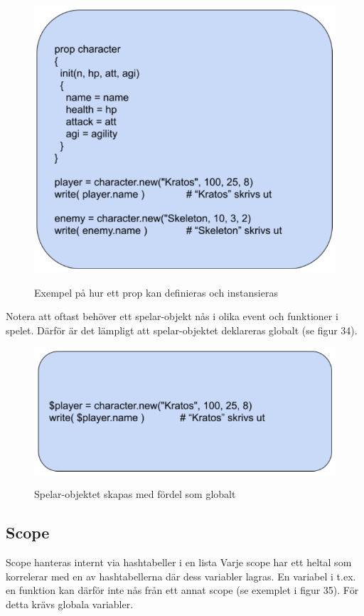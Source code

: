 \documentclass{Dokumentmall}
\begin{document}
\begin{figure}[h!]
  \centering
  \includegraphics[scale = 0.65]{Images/Figur33.png}
  \label{}
  \caption{Exempel på hur ett prop kan definieras och instansieras}
\end{figure}

Notera att oftast behöver ett spelar-objekt nås i olika event och funktioner i spelet. Därför är det lämpligt att spelar-objektet deklareras globalt (se figur 34).

\begin{figure}[h!]
  \centering
  \includegraphics[scale = 0.65]{Images/Figur34.png}
  \label{}
  \caption{Spelar-objektet skapas med fördel som globalt}
\end{figure}

\newpage
\subsection{Scope}
Scope hanteras internt via hashtabeller i en lista Varje scope har ett heltal som korrelerar med en av hashtabellerna där dess variabler lagras. En variabel i t.ex. en funktion kan därför inte nås från ett annat scope (se exemplet i figur 35). För detta krävs globala variabler.
\end{document}

